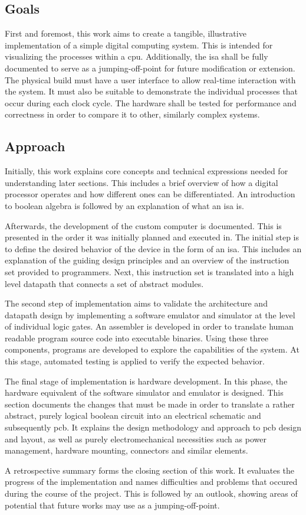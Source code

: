 \subsection{Goals}

First and foremost, this work aims to create a tangible, illustrative implementation of a simple digital computing system. This is intended for visualizing the processes within a \ac{cpu}. Additionally, the \ac{isa} shall be fully documented to serve as a jumping-off-point for future modification or extension. The physical build must have a user interface to allow real-time interaction with the system. It must also be suitable to demonstrate the individual processes that occur during each clock cycle. The hardware shall be tested for performance and correctness in order to compare it to other, similarly complex systems.

\subsection{Approach}

Initially, this work explains core concepts and technical expressions needed for understanding later sections. This includes a brief overview of how a digital processor operates and how different ones can be differentiated. An introduction to boolean algebra is followed by an explanation of what an \ac{isa} is.

Afterwards, the development of the custom computer is documented. This is presented in the order it was initially planned and executed in. The initial step is to define the desired behavior of the device in the form of an \ac{isa}. This includes an explanation of the guiding design principles and an overview of the instruction set provided to programmers. Next, this instruction set is translated into a high level datapath that connects a set of abstract modules.

The second step of implementation aims to validate the architecture and datapath design by implementing a software emulator and simulator at the level of individual logic gates. An assembler is developed in order to translate human readable program source code into executable binaries. Using these three components, programs are developed to explore the capabilities of the system. At this stage, automated testing is applied to verify the expected behavior.

The final stage of implementation is hardware development. In this phase, the hardware equivalent of the software simulator and emulator is designed. This section documents the changes that must be made in order to translate a rather abstract, purely logical boolean circuit into an electrical schematic and subsequently \ac{pcb}. It explains the design methodology and approach to \ac{pcb} design and layout, as well as purely electromechanical necessities such as power management, hardware mounting, connectors and similar elements.

A retrospective summary forms the closing section of this work. It evaluates the progress of the implementation and names difficulties and problems that occured during the course of the project. This is followed by an outlook, showing areas of potential that future works may use as a jumping-off-point.